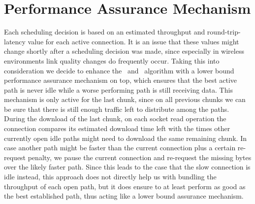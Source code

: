 \section{Performance Assurance Mechanism}
\label{sec:performance-assurance}

Each scheduling decision is based on an estimated throughput and round-trip-latency value for each active connection. 
It is an issue that these values might change shortly after a scheduling decision was made, since especially in wireless environments link quality changes do frequently occur. 
Taking this into consideration we decide to enhance the \algalpha~and \algslice~algorithm with a lower bound performance assurance mechanism on top, which ensures that the best active path is never idle while a worse performing path is still receiving data. 
This mechanism is only active for the last chunk, since on all previous chunks we can be sure that there is still enough traffic left to distribute among the paths. 
During the download of the last chunk, on each socket read operation the connection compares its estimated download time left with the times other currently open idle paths might need to download the same remaining chunk. 
In case another path might be faster than the current connection plus a certain re-request penalty, we pause the current connection and re-request the missing bytes over the likely faster path.
Since this leads to the case that the slow connection is idle instead, this approach does not directly help us with bundling the throughput of each open path, but it does ensure to at least perform as good as the best established path, thus acting like a lower bound assurance mechanism. 
